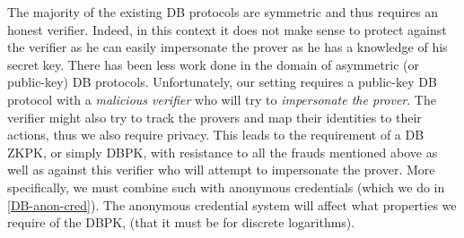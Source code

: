 The majority of the existing \ac{DB} protocols are symmetric and thus requires an honest verifier.
Indeed, in this context it does not make sense to protect against the verifier 
as he can easily impersonate the prover as he has a knowledge of his secret key.
There has been less work done in the domain of asymmetric (or public-key) \ac{DB} protocols.
Unfortunately, our setting requires a public-key \ac{DB} protocol with a \emph{malicious verifier} who will try to \emph{impersonate the prover}.
The verifier might also try to track the provers and map their identities to their actions, thus we also require privacy.
This leads to the requirement of a \ac{DB} \ac{ZKPK}, or simply \ac{DBPK}, with resistance to all the frauds mentioned above as well as against this verifier 
who will attempt to impersonate the prover.
More specifically, we must combine such  with anonymous credentials 
(which we do in \cref{DB-anon-cred}).
The anonymous credential system will affect what properties we require of the \ac{DBPK}, (\eg that it must be  for discrete logarithms).

